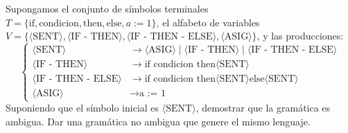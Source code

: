 \begin{ejercicio}\label{ej:1.4.22}
    Supongamos el conjunto de símbolos terminales $T = \{ \text{if}, \text{condicion}, \text{then}, \text{else}, a := 1 \}$, el alfabeto de variables $V = \{ \langle \text{SENT} \rangle, \langle \text{IF - THEN} \rangle, \langle \text{IF - THEN - ELSE} \rangle, \langle \text{ASIG} \rangle \}$, y las producciones:
    \begin{equation*}
        \left\{
            \begin{aligned}
                \langle \text{SENT} \rangle &\rightarrow \langle \text{ASIG} \rangle \mid \langle \text{IF - THEN} \rangle \mid \langle \text{IF - THEN - ELSE} \rangle\\
                \langle \text{IF - THEN} \rangle &\rightarrow \text{if condicion then} \langle \text{SENT} \rangle\\
                \langle \text{IF - THEN - ELSE} \rangle &\rightarrow \text{if condicion then} \langle \text{SENT} \rangle \text{else} \langle \text{SENT} \rangle\\
                \langle \text{ASIG} \rangle &\rightarrow \text{a := 1}
            \end{aligned}
        \right.
    \end{equation*}
    Suponiendo que el símbolo inicial es $\langle \text{SENT} \rangle$, demostrar que la gramática es ambigua. Dar una gramática no ambigua que genere el mismo lenguaje.
\end{ejercicio}

